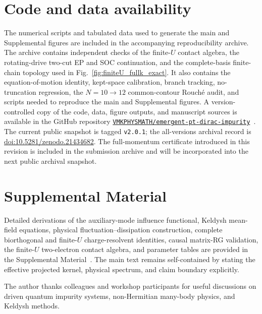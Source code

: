 \documentclass[%
  aps,prb,reprint,amsmath,amssymb,superscriptaddress,longbibliography,floatfix
]{revtex4-2}
\begin{document}
\section*{Code and data availability}
The numerical scripts and tabulated data used to generate the main and
Supplemental figures are included in the accompanying reproducibility archive.
The archive contains independent checks of the finite-$U$ contact algebra,
the rotating-drive two-cut EP and SOC continuation, and the complete-basis
finite-chain topology used in Fig.~\ref{fig:finiteU_fullk_exact}.  It also
contains the equation-of-motion identity, kept-space calibration, branch
tracking, no-truncation regression, the $N=10\to12$ common-contour Rouch\'e
audit, and scripts needed to reproduce the main and Supplemental figures.
A version-controlled copy of the code, data, figure outputs, and manuscript
sources is available in the GitHub repository
\href{https://github.com/VMKPHYSMATH/emergent-pt-dirac-impurity}{\texttt{VMKPHYSMATH/emergent-pt-dirac-impurity}}~\cite{kulkarni2026code}.
The current public snapshot is tagged \texttt{v2.0.1}; the all-versions
archival record is
\href{https://doi.org/10.5281/zenodo.21434682}{doi:10.5281/zenodo.21434682}.
The full-momentum certificate introduced in this revision is included in the
submission archive and will be incorporated into the next public archival
snapshot.

\section*{Supplemental Material}
Detailed derivations of the auxiliary-mode influence functional, Keldysh
mean-field equations, physical fluctuation--dissipation construction, complete
biorthogonal and finite-$U$ charge-resolvent identities, causal matrix-RG
validation, the finite-$U$ two-electron contact algebra, and parameter tables
are provided in the Supplemental Material~\cite{suppmat}.
The main text remains self-contained by stating the effective projected kernel,
physical spectrum, and claim boundary explicitly.

\begin{acknowledgments}
The author thanks colleagues and workshop participants for useful
discussions on driven quantum impurity systems, non-Hermitian
many-body physics, and Keldysh methods.
\end{acknowledgments}



\end{document}
